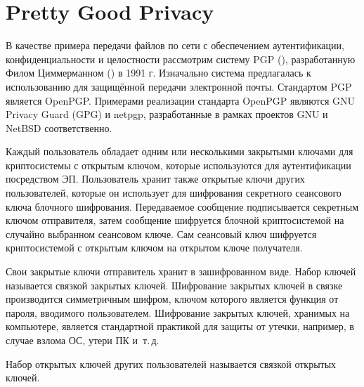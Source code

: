 \section{Pretty Good Privacy}

В качестве примера передачи файлов по сети с обеспечением аутентификации, конфиденциальности и целостности рассмотрим систему PGP (), разработанную Филом Циммерманном () в 1991 г. Изначально система предлагалась к использованию для защищённой передачи электронной почты. Стандартом PGP является OpenPGP. Примерами реализации стандарта OpenPGP являются GNU Privacy Guard (GPG) и netpgp, разработанные в рамках проектов GNU и NetBSD соответственно.

Каждый пользователь обладает одним или несколькими закрытыми ключами для криптосистемы с открытым ключом, которые используются для аутентификации посредством ЭП. Пользователь хранит также открытые ключи других пользователей, которые он использует для шифрования секретного сеансового ключа блочного шифрования. Передаваемое сообщение подписывается секретным ключом отправителя, затем сообщение шифруется блочной криптосистемой на случайно выбранном сеансовом ключе. Сам сеансовый ключ шифруется криптосистемой с открытым ключом на открытом ключе получателя.

Свои закрытые ключи отправитель хранит в зашифрованном виде. Набор ключей называется связкой закрытых ключей. Шифрование закрытых ключей в связке производится симметричным шифром, ключом которого является функция от пароля, вводимого пользователем. Шифрование закрытых ключей, хранимых на компьютере, является стандартной практикой для защиты от утечки, например, в случае взлома ОС, утери ПК и~т.\,д.

Набор открытых ключей других пользователей называется связкой открытых ключей.

